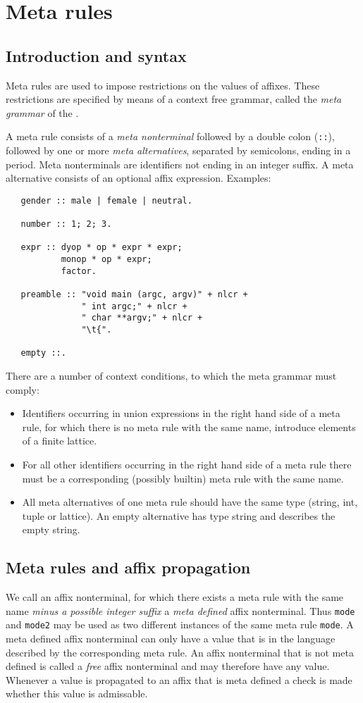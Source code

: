 \chapter {Meta rules}
\section {Introduction and syntax}
Meta rules are used to impose restrictions on the values of affixes.
These restrictions are specified by means of a context free grammar,
called the {\em meta grammar} of the \EAGns.

A meta rule consists of a {\em meta nonterminal} followed by a
double colon (\verb+::+), followed by one or more {\em meta alternatives},
separated by semicolons, ending in a period. Meta nonterminals are
identifiers not ending in an integer suffix. A meta alternative consists
of an optional affix expression. 
Examples:
\begin{verbatim}
   gender :: male | female | neutral.

   number :: 1; 2; 3.

   expr :: dyop * op * expr * expr;
           monop * op * expr;
           factor.

   preamble :: "void main (argc, argv)" + nlcr +
               " int argc;" + nlcr +
               " char **argv;" + nlcr +
               "\t{".

   empty ::.
\end{verbatim}
There are a number of context conditions, to which the meta grammar
must comply:
\begin{itemize}
\item Identifiers occurring in union expressions in the right hand
side of a meta rule, for which there is no meta rule with the same
name, introduce elements of a finite lattice.
\item For all other identifiers occurring in the right hand side of a
meta rule there must be a corresponding (possibly builtin) meta
rule with the same name.
\item All meta alternatives of one meta rule should have the same
type (string, int, tuple or lattice). An empty alternative has type
string and describes the empty string.
\end {itemize}
\section {Meta rules and affix propagation}
We call an affix nonterminal, for which there exists a meta rule
with the same name {\em minus a possible integer suffix}
a {\em meta defined} affix nonterminal. Thus \verb+mode+ and
\verb+mode2+ may be used as two different instances of the same
meta rule \verb+mode+. A meta defined affix nonterminal
can only have a value that is in the language described by the
corresponding meta rule. An affix nonterminal that is not meta
defined is called a {\em free} affix nonterminal and may therefore
have any value. Whenever a value is propagated to an affix that
is meta defined a check is made whether this value is admissable.

